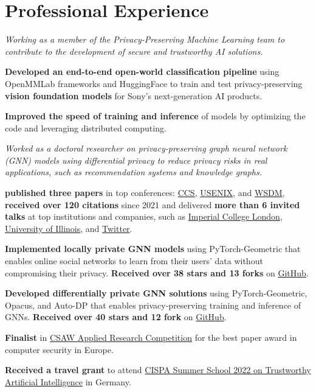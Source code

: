 \documentclass[11pt]{article}
\begin{document}
\section{Professional Experience}

\begin{outerlist}

{\textit{Working as a member of the Privacy-Preserving Machine Learning team to contribute to the development of secure and trustworthy AI solutions.}
  \begin{innerlist}
    \item \textbf{Developed an end-to-end open-world classification pipeline} using OpenMMLab frameworks and HuggingFace to train and test privacy-preserving \textbf{vision foundation models} for Sony's next-generation AI products.
    \item \textbf{Improved the speed of training and inference} of models by optimizing the code and leveraging distributed computing.
  \end{innerlist}}

{\textit{Worked as a doctoral researcher on privacy-preserving graph neural network (GNN) models using differential privacy to reduce privacy risks in real applications, such as recommendation systems and knowledge graphs.}
	\begin{innerlist}
		\item \textbf{published three papers} in top conferences: \href{https://www.sigsac.org/ccs/CCS2021/}{CCS}, \href{https://www.usenix.org/conference/usenixsecurity23/}{USENIX}, and \href{https://www.wsdm-conference.org/2024/}{WSDM}, \textbf{received over 120 citations} since 2021 and delivered \textbf{more than 6 invited talks} at top institutions and companies, such as \href{https://ix.imperial.ac.uk/}{Imperial College London}, \href{https://cs.uic.edu/}{University of Illinois}, and \href{https://twitter.com/}{Twitter}.
		\item \textbf{Implemented locally private GNN models} using {PyTorch-Geometric} that enables online social networks to learn from their users' data without compromising their privacy. \textbf{Received over 38 stars and 13 forks} on \href{https://github.com/sisaman/LPGNN}{GitHub}.
		\item \textbf{Developed differentially private GNN solutions} using {PyTorch-Geometric}, {Opacus}, and {Auto-DP} that enables privacy-preserving training and inference of GNNs. \textbf{Received over 40 stars and 12 fork} on \href{https://github.com/sisaman/GAP}{GitHub}.
		\item \textbf{Finalist} in \href{https://www.csaw.io/research}{CSAW Applied Research Competition} for the best paper award in computer security in Europe.
		\item \textbf{Received a travel grant} to attend \href{https://cispa.de/en/summer-school-2022}{CISPA Summer School 2022 on Trustworthy Artificial Intelligence} in Germany.
	\end{innerlist}}


\end{outerlist}
\end{document}

